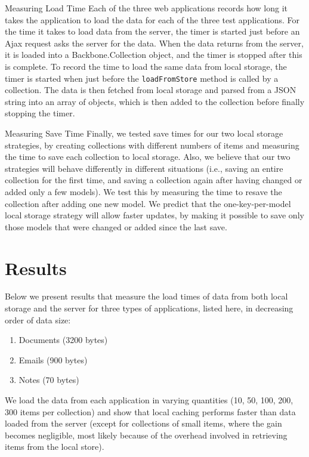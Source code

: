 \documentclass[12pt]{article}
\begin{document}
Measuring Load Time
Each of the three web applications records how long it takes the application to
load the data for each of the three test applications. For the time it takes to
load data from the server, the timer is started just before an Ajax request
asks the server for the data. When the data returns from the server, it is
loaded into a Backbone.Collection object, and the timer is stopped after this
is complete. To record the time to load the same data from local storage, the
timer is started when just before the \verb=loadFromStore= method is called by
a collection. The data is then fetched from local storage and parsed from a JSON
string into an array of objects, which is then added to the collection before
finally stopping the timer.

Measuring Save Time
Finally, we tested save times for our two local storage strategies, by
creating collections with different numbers of items and measuring the time to
save each collection to local storage. Also, we believe that our two strategies
will behave differently in different situations (i.e., saving an entire
collection for the first time, and saving a collection again after having
changed or added only a few models). We test this by measuring the time to
resave the collection after adding one new model. We predict that the
one-key-per-model local storage strategy will allow faster updates, by making
it possible to save only those models that were changed or added since the last
save.

\section{Results}

Below we present results that measure the load times of data from both local
storage and the server for three types of applications, listed here, in
decreasing order of data size:

\begin{enumerate}
\item Documents (3200 bytes)
\item Emails (900 bytes)
\item Notes (70 bytes)
\end{enumerate}

We load the data from each application in varying quantities (10, 50, 100, 200,
300 items per collection) and show that local caching performs faster than data
loaded from the server (except for collections of small items, where the gain
becomes negligible, most likely because of the overhead involved in retrieving
items from the local store).
\end{document}
